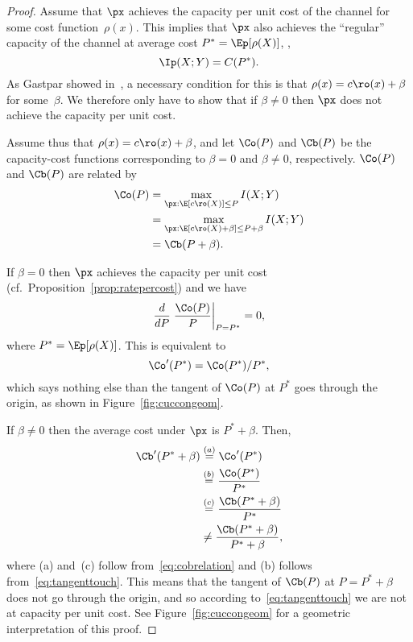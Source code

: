 \begin{proof}
  Assume that $\px$ achieves the capacity per unit cost of the channel for some
  cost function~$\rho(x)$. This implies that $\px$ also achieves the ``regular''
  capacity of the channel at average cost $P^* = \Ep[\rho(X)]$, \ie, 
  \[ \Ip(X;Y) = C(P^*). \]
  As Gastpar showed in~\cite{GastparRV2003}, a necessary condition for this is
  that $\rho(x) = c\ro(x) + \beta$ for some~$\beta$. We therefore only have to
  show that if $\beta \ne 0$ then $\px$ does not achieve the capacity per unit
  cost. 

  Assume thus that $\rho(x) = c\ro(x) + \beta$, and let $\Co(P)$ and $\Cb(P)$ be
  the capacity-cost functions corresponding to $\beta = 0$ and $\beta \ne 0$,
  respectively. $\Co(P)$ and $\Cb(P)$ are related by
  \begin{align}
    \Co(P) &= \max_{\px: \E[c\ro(X)] \le P} I(X;Y) \nonumber \\
    &= \max_{\px: \E[c\ro(X) + \beta] \le P + \beta} I(X;Y) \nonumber \\
    &= \Cb(P + \beta). \label{eq:cobrelation}
  \end{align}

  If $\beta = 0$ then $\px$ achieves the capacity per unit cost (cf.\
  Proposition~\ref{prop:ratepercost}) and we have
  \begin{equation*}
    \frac{d}{dP} \left. \frac{\Co(P)}{P} \right|_{P=P^*} = 0,
  \end{equation*}
  where $P^* = \Ep[\rho(X)]$. This is equivalent to
  \begin{equation}
    \label{eq:tangenttouch}
    \Co'(P^*) = \Co(P^*)/P^*,
  \end{equation}
  which says nothing else than the tangent of $\Co(P)$ at $P^*$
  goes through the origin, as shown in Figure~\ref{fig:cuccongeom}.

  If $\beta \ne 0$ then the average cost under $\px$ is $P^* + \beta$. Then,
  \begin{align*}
    \Cb'(P^* + \beta) &\stackrel{(a)}{=} \Co'(P^*) \\
    &\stackrel{(b)}{=} \frac{\Co(P^*)}{P^*} \\
    &\stackrel{(c)}{=} \frac{\Cb(P^*+\beta)}{P^*} \\
    &\ne \frac{\Cb(P^* + \beta)}{P^* + \beta},
  \end{align*}
  where (a) and~(c) follow from~\eqref{eq:cobrelation} and (b) follows
  from~\eqref{eq:tangenttouch}.  This means that the tangent of $\Cb(P)$ at
  $P = P^* + \beta$ does not go through the origin, and so according
  to~\eqref{eq:tangenttouch} we are not at capacity per unit cost.
  See Figure~\ref{fig:cuccongeom} for a geometric interpretation of this proof.
\end{proof}

